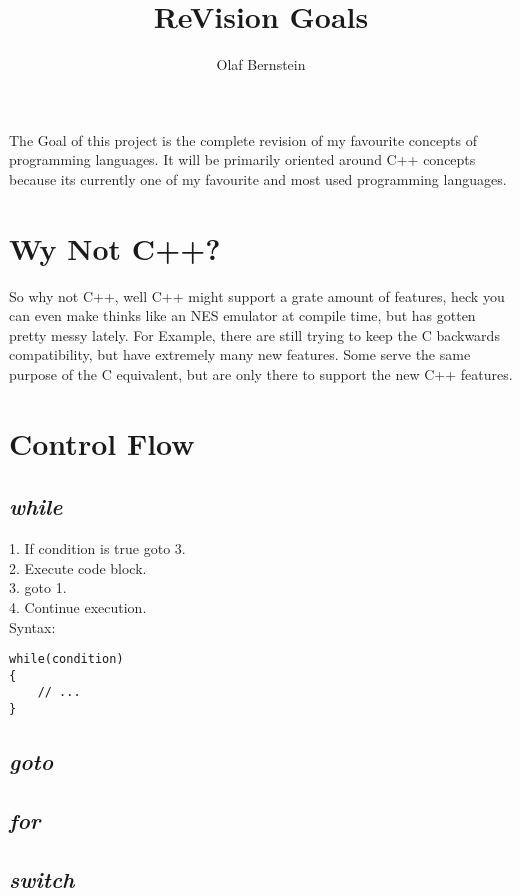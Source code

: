 \documentclass[10pt,a4paper]{article}
\author{Olaf Bernstein}
\title{ReVision Goals}
\begin{document}
\maketitle
The Goal of this project is the complete revision of my favourite concepts of programming languages. It will be primarily oriented around C++ concepts because its currently one of my favourite and most used programming languages.
\tableofcontents




\section{Wy Not C++?}
So why not C++, well C++ might support a grate amount of features, heck you can even make thinks like an NES emulator at compile time, but has gotten pretty messy lately. For Example, there are still trying to keep the C backwards compatibility, but have extremely many new features. Some serve the same purpose of the C equivalent, but are only there to support the new C++ features.




\section{Control Flow}


\subsection{\textit{while}}
1. If condition is true goto 3. \\
2. Execute code block. \\
3. goto 1. \\
4. Continue execution. \\
Syntax:
\begin{lstlisting}
while(condition)
{
	// ...
}
\end{lstlisting}


\subsection{\textit{goto}}


\subsection{\textit{for}}


\subsection{\textit{switch}}
\end{document}
